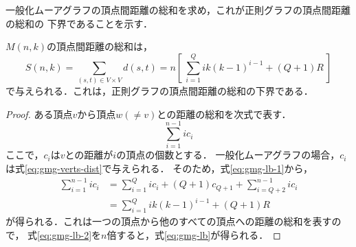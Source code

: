一般化ムーアグラフの頂点間距離の総和を求め，これが正則グラフの頂点間距離の総和の
下界であることを示す．
\begin{theorem}
  \label{thm:gmg-lower-bound}
  $M(n,k)$の頂点間距離の総和は，
  \begin{equation}
    \label{eq:gmg-lb}
    S(n,k) = \sum_{(s,t)\in V\times V}d(s,t) =
    n \left[\ \sum^{Q}_{i=1}ik(k-1)^{i-1} + (Q+1)R\ \right]
  \end{equation}
  で与えられる．これは，正則グラフの頂点間距離の総和の下界である．
\end{theorem}
\begin{proof}
  ある頂点$v$から頂点$w(\neq v)$との距離の総和を次式で表す．
  \begin{equation}
    \label{eq:gmg-lb-1}
    \sum_{i=1}^{n-1}i c_i
  \end{equation}
  ここで，$c_i$は$v$との距離が$i$の頂点の個数とする．
  一般化ムーアグラフの場合，$c_i$は式\ref{eq:gmg-verts-dist}で与えられる．
  そのため，式\ref{eq:gmg-lb-1}から，
  \begin{align}
      \sum_{i=1}^{n-1}ic_i
      &=\sum_{i=1}^{Q}ic_i+(Q+1)c_{Q+1}+\sum_{i=Q+2}^{n-1}ic_i \nonumber\\
      &=\sum_{i=1}^{Q}ik(k-1)^{i-1}+(Q+1)R
      \label{eq:gmg-lb-2}
  \end{align}
  が得られる．これは一つの頂点から他のすべての頂点への距離の総和を表すので，
  式\ref{eq:gmg-lb-2}を$n$倍すると，式\ref{eq:gmg-lb}が得られる．


\end{proof}

